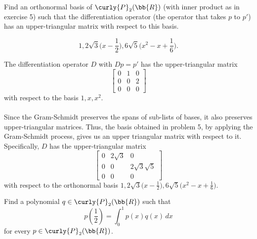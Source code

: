 \documentclass[12pt, letterpaper]{hmcpset}
\begin{document}
\pagebreak

\begin{problem}[6]
	Find an orthonormal basis of $\curly{P}_2(\bb{R})$ (with inner product as in exercise 5) such that the differentiation operator (the operator that takes $p$ to $p'$) has an upper-triangular matrix with respect to this basis.
\end{problem}

\begin{solution}
	\[
		\boxed{
			1, 2 \sqrt 3 \Big ( x - \frac{1}{2} \Big ), 6 \sqrt 5 \Big ( x^2 - x + \frac{1}{6} \Big ).
		}
	\]

	The differentiation operator $D$ with $D p = p'$ has the upper-triangular matrix
	\[
		\begin{bmatrix}
			0 & 1 & 0 \\
			0 & 0 & 2 \\
			0 & 0 & 0
		\end{bmatrix}
	\]
	with respect to the basis $1, x, x^2$. \\\\
	Since the Gram-Schmidt preserves the spans of sub-lists of bases, it also preserves upper-triangular matrices. Thus, the basis obtained in problem 5, by applying the Gram-Schmidt process, gives us an upper triangular matrix with respect to it. Specifically, $D$ has the upper-triangular matrix
	\[
		\begin{bmatrix}
			0 & 2 \sqrt 3 & 0 \\
			0 & 0 & 2 \sqrt 3 \sqrt 5 \\
			0 & 0 & 0
		\end{bmatrix}
	\]
	with respect to the orthonormal basis $1, 2 \sqrt 3 \Big ( x - \frac{1}{2} \Big ), 6 \sqrt 5 \Big ( x^2 - x + \frac{1}{6} \Big )$.
\end{solution}

\pagebreak

\begin{problem}[7]
	Find a polynomial $q \in \curly{P}_2(\bb{R})$ such that
	\[
		p(\frac{1}{2}) = \int_0^1 p(x) q(x) \, dx
	\]
	for every $p \in \curly{P}_2(\bb{R})$.
\end{problem}
\end{document}
